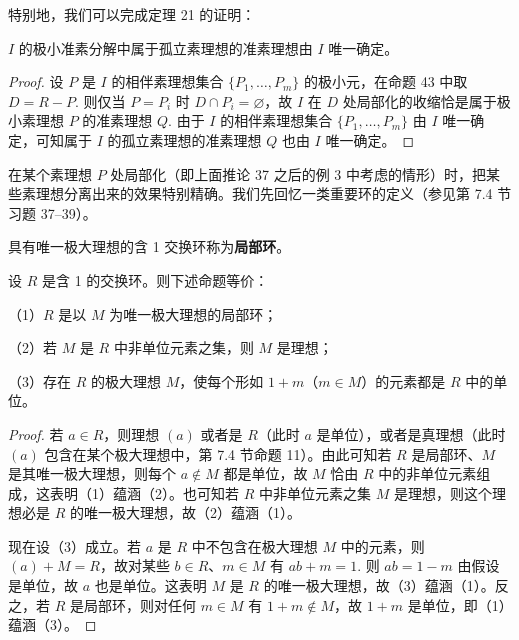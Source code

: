 特别地，我们可以完成定理 21 的证明：

\begin{corollary}\label{cor:15.44}
\(I\) 的极小准素分解中属于孤立素理想的准素理想由 \(I\) 唯一确定。
\end{corollary}

\begin{proof}
设 \(P\) 是 \(I\) 的相伴素理想集合 \(\{P_1, \ldots, P_m\}\) 的极小元，在命题 43 中取 \(D = R-P\). 则仅当 \(P = P_i\) 时 \(D \cap P_i = \varnothing\)，故 \(I\) 在 \(D\) 处局部化的收缩恰是属于极小素理想 \(P\) 的准素理想 \(Q\). 由于 \(I\) 的相伴素理想集合 \(\{P_1, \ldots, P_m\}\) 由 \(I\) 唯一确定，可知属于 \(I\) 的孤立素理想的准素理想 \(Q\) 也由 \(I\) 唯一确定。
\end{proof}

在某个素理想 \(P\) 处局部化（即上面推论 37 之后的例 3 中考虑的情形）时，把某些素理想分离出来的效果特别精确。我们先回忆一类重要环的定义（参见第 7.4 节习题 37--39）。

\begin{definition}
具有唯一极大理想的含 1 交换环称为\textbf{局部环}。
\end{definition}

\begin{proposition}\label{pro:15.45}
设 \(R\) 是含 1 的交换环。则下述命题等价：

（1）\(R\) 是以 \(M\) 为唯一极大理想的局部环；

（2）若 \(M\) 是 \(R\) 中非单位元素之集，则 \(M\) 是理想；

（3）存在 \(R\) 的极大理想 \(M\)，使每个形如 \(1+m\)（\(m \in M\)）的元素都是 \(R\) 中的单位。
\end{proposition}

\begin{proof}
若 \(a \in R\)，则理想 \((a)\) 或者是 \(R\)（此时 \(a\) 是单位），或者是真理想（此时 \((a)\) 包含在某个极大理想中，第 7.4 节命题 11）。由此可知若 \(R\) 是局部环、\(M\) 是其唯一极大理想，则每个 \(a \notin M\) 都是单位，故 \(M\) 恰由 \(R\) 中的非单位元素组成，这表明（1）蕴涵（2）。也可知若 \(R\) 中非单位元素之集 \(M\) 是理想，则这个理想必是 \(R\) 的唯一极大理想，故（2）蕴涵（1）。

现在设（3）成立。若 \(a\) 是 \(R\) 中不包含在极大理想 \(M\) 中的元素，则 \((a)+M = R\)，故对某些 \(b \in R\)、\(m \in M\) 有 \(ab+m = 1\). 则 \(ab = 1-m\) 由假设是单位，故 \(a\) 也是单位。这表明 \(M\) 是 \(R\) 的唯一极大理想，故（3）蕴涵（1）。反之，若 \(R\) 是局部环，则对任何 \(m \in M\) 有 \(1+m \notin M\)，故 \(1+m\) 是单位，即（1）蕴涵（3）。
\end{proof}

